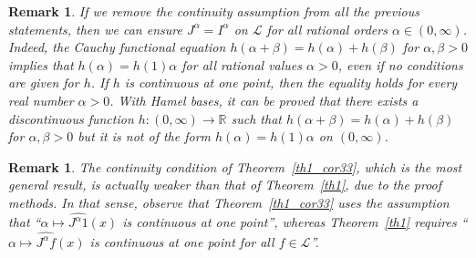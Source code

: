\documentclass[12pt,reqno]{amsart}
\theoremstyle{plain}
\newtheorem{remark}[theorem]{Remark}
\numberwithin{equation}{section} %
\begin{document}
\begin{remark} \label{rm_QQ} \normalfont
If we remove the continuity assumption from all the previous statements, then we can ensure $J^\alpha=I^\alpha$ on $\mathcal{L}$ for all rational orders $\alpha\in (0,\infty)$. Indeed, the Cauchy functional equation $h(\alpha+\beta)=h(\alpha)+h(\beta)$ for $\alpha,\beta>0$ implies that $h(\alpha)=h(1)\alpha$ for all rational values $\alpha>0$, even if no conditions are given for $h$. If $h$ is continuous at one point, then the equality holds for every real number $\alpha>0$. With Hamel bases, it can be proved that there exists a discontinuous function $h:(0,\infty)\rightarrow\mathbb{R}$ such that $h(\alpha+\beta)=h(\alpha)+h(\beta)$ for $\alpha,\beta>0$ but it is not of the form $h(\alpha)=h(1)\alpha$ on $(0,\infty)$.
\end{remark}


\begin{remark} \normalfont
The continuity condition of Theorem~\ref{th1_cor33}, which is the most general result, is actually weaker than that of Theorem~\ref{th1}, due to the proof methods. In that sense, observe that Theorem~\ref{th1_cor33} uses the assumption that ``$\alpha\mapsto \widehat{J^{\alpha}1}(x)$ is continuous at one point'', whereas Theorem~\ref{th1} requires ``$\alpha\mapsto \widehat{J^{\alpha}f}(x)$ is continuous at one point for all $f\in\mathcal{L}$''.
\end{remark}
\end{document}
